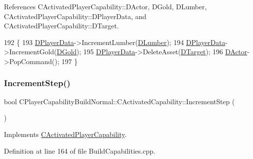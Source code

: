 References C\+Activated\+Player\+Capability\+::\+D\+Actor, D\+Gold, D\+Lumber, C\+Activated\+Player\+Capability\+::\+D\+Player\+Data, and C\+Activated\+Player\+Capability\+::\+D\+Target.


\begin{DoxyCode}
192                                                              \{
193     \hyperlink{classCActivatedPlayerCapability_a9bf27c322a73f4b11c8183cc1973c3d8}{DPlayerData}->IncrementLumber(\hyperlink{classCPlayerCapabilityBuildNormal_1_1CActivatedCapability_acc7750973121c2b8ada035bca9264229}{DLumber});
194     \hyperlink{classCActivatedPlayerCapability_a9bf27c322a73f4b11c8183cc1973c3d8}{DPlayerData}->IncrementGold(\hyperlink{classCPlayerCapabilityBuildNormal_1_1CActivatedCapability_a8997bc10da71f5df340096cd0d717d84}{DGold});
195     \hyperlink{classCActivatedPlayerCapability_a9bf27c322a73f4b11c8183cc1973c3d8}{DPlayerData}->DeleteAsset(\hyperlink{classCActivatedPlayerCapability_a8a1cf50b6501bcfd55af0c935828e395}{DTarget});
196     \hyperlink{classCActivatedPlayerCapability_a54ca944b47bff2718330639941d402b0}{DActor}->PopCommand();
197 \}
\end{DoxyCode}
\hypertarget{classCPlayerCapabilityBuildNormal_1_1CActivatedCapability_a19b9ba979e8deebcb2b7e4225af47d2e}{}\label{classCPlayerCapabilityBuildNormal_1_1CActivatedCapability_a19b9ba979e8deebcb2b7e4225af47d2e} 
\subsubsection{\texorpdfstring{Increment\+Step()}{IncrementStep()}}
{\footnotesize\ttfamily bool C\+Player\+Capability\+Build\+Normal\+::\+C\+Activated\+Capability\+::\+Increment\+Step (\begin{DoxyParamCaption}{ }\end{DoxyParamCaption})\hspace{0.3cm}{\ttfamily [virtual]}}



Implements \hyperlink{classCActivatedPlayerCapability_a943b5999a57504399293250382c0ec6a}{C\+Activated\+Player\+Capability}.



Definition at line 164 of file Build\+Capabilities.\+cpp.



